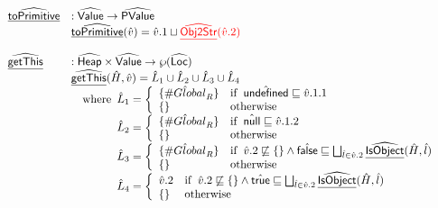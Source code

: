 \documentclass{article}
\newcommand{\SF}[1]{\mbox{\textsf{#1}}}
\newcommand{\wherec}[1]{{\rm where}\begin{array}[t]{l}#1\end{array}}
\newcommand{\ifc}[1]{{\rm if}\begin{array}[t]{l}#1\end{array}}
\newcommand{\owc}{{\rm otherwise}}
\newcommand{\Loc}{\SF{Loc}}
\newcommand{\abs}[1]{\widehat{\SF{#1}}}
\newcommand{\aHeap}{\abs{Heap}}
\newcommand{\aLoc}{\abs{Loc}}
\newcommand{\aValue}{\abs{Value}}
\newcommand{\set}[1]{\left\{\begin{array}{l}#1\end{array}\right\}}
\newcommand{\powerset}[1]{\wp(#1)}
\newcommand{\ahf}[1]{\widehat{\underline{\sf #1}}}
\newcommand{\avarloc}[1]{\hat{\##1}}
\newcommand{\vtrue}{\SF{true}}
\newcommand{\vfalse}{\SF{false}}
\newcommand{\atrue}{\hat{\SF{true}}}
\newcommand{\afalse}{\hat{\SF{false}}}
\newcommand{\aundef}{\hat{\SF{undefined}}}
\newcommand{\anull}{\hat{\SF{null}}}
\def\inred{\color{red}}
\begin{document}
\[
\begin{array}{ll}
\\
\ahf{toPrimitive} & : \aValue \rightarrow \abs{PValue} \\
& \ahf{toPrimitive}(\hat{v})
  = \hat{v}.1 \sqcup \inred \ahf{Obj2Str}(\hat{v}.2) \\
\\
\ahf{getThis} & : \aHeap \times \aValue \rightarrow \powerset{\aLoc} \\
& \ahf{getThis}(\hat{H}, \hat{v})
  = \hat{L}_1\cup\hat{L}_2\cup\hat{L}_3\cup\hat{L}_4\\
& \quad\wherec{
  \hat{L}_1 = \left\{
    \begin{array}{ll}
      \{\avarloc{Global}_R\} & \ifc{\aundef\sqsubseteq\hat{v}.1.1} \\
      \{\} & \owc \\
    \end{array}
    \right.\\
  \hat{L}_2 = \left\{
    \begin{array}{ll}
      \{\avarloc{Global}_R\} & \ifc{\anull\sqsubseteq\hat{v}.1.2} \\
      \{\} & \owc \\
    \end{array}
    \right.\\
  \hat{L}_3 = \left\{
    \begin{array}{ll}
      \{\avarloc{Global}_R\} & \ifc{\hat{v}.2\not\sqsubseteq\set{}
                         \land \afalse\sqsubseteq\bigsqcup_{\hat{l}\in\hat{v}.2}\ahf{IsObject}(\hat{H},\hat{l})} \\
      \{\} & \owc \\
    \end{array}
    \right.\\
  \hat{L}_4 = \left\{
    \begin{array}{ll}
      \hat{v}.2 & \ifc{\hat{v}.2\not\sqsubseteq\set{}
                     \land \atrue\sqsubseteq\bigsqcup_{\hat{l}\in\hat{v}.2}\ahf{IsObject}(\hat{H},\hat{l})} \\
      \{\} & \owc \\
    \end{array}
    \right.\\
}


\end{array}\]
\end{document}
